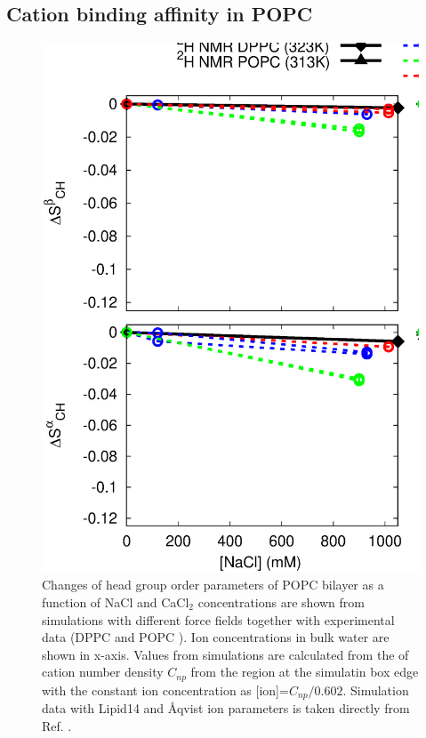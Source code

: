 \documentclass[aip,jcp,twocolumn]{revtex4}
\begin{document}
\subsection{Cation binding affinity in POPC}

\begin{figure}[tbp]
  \centering
  \includegraphics[width=16.0cm]{../Fig/OrdParChanges_NaCl_CaCl2.eps}
  \caption{\label{OrderParameterCHANGESnewMODELS}
    Changes of head group order parameters of POPC bilayer as a function of NaCl and CaCl$_2$ concentrations
    are shown from simulations with different force fields together with experimental data 
    (DPPC \cite{akutsu81} and POPC \cite{altenbach84}). 
    Ion concentrations in bulk water are shown in x-axis. 
    Values from simulations are calculated from the of cation number density $C_{np}$
    from the region at the simulatin box edge with the constant ion concentration as [ion]=$C_{np}/0.602$.
    Simulation data with Lipid14 and \AA{}qvist ion parameters is taken directly from Ref. \cite{catte16}.
  }
\end{figure}
\end{document}
